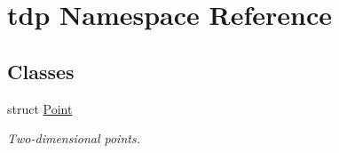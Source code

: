 \hypertarget{namespacetdp}{}\section{tdp Namespace Reference}
\label{namespacetdp}
\subsection*{Classes}
\begin{DoxyCompactItemize}
\item 
struct \mbox{\hyperlink{structtdp_1_1_point}{Point}}
\begin{DoxyCompactList}\small\item\em Two-\/dimensional points. \end{DoxyCompactList}\end{DoxyCompactItemize}
